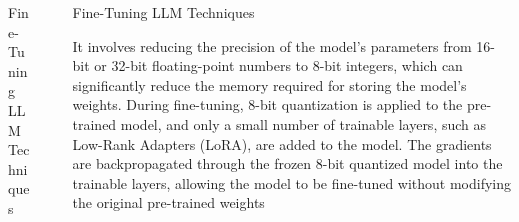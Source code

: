 \documentclass[final]{beamer}
\newlength{\sepwidth}
\newlength{\colwidth}
\newcommand{\separatorcolumn}{\begin{column}{\sepwidth}\end{column}}
\begin{document}
\begin{frame}[t]
\begin{columns}[t]
\begin{column}{\colwidth}
\begin{block}{Fine-Tuning LLM Techniques}
    \end{block}
\end{column}

\separatorcolumn

\begin{column}{\colwidth}
    \begin{block}{Fine-Tuning LLM Techniques}
        \begin{minipage}[t]{.65\textwidth}
            \raggedright
                It involves reducing the precision of the model's parameters from 16-bit or 32-bit floating-point numbers to 8-bit integers, which can significantly reduce the memory required for storing the model's weights. 
                During fine-tuning, 8-bit quantization is applied to the pre-trained model, and only a small number of trainable layers, such as Low-Rank Adapters (LoRA), are added to the model. The gradients are backpropagated through the frozen 8-bit quantized model into the trainable layers, allowing the model to be fine-tuned without modifying the original pre-trained weights
        \end{minipage}
        \begin{minipage}[t]{.30\textwidth}
        \vspace{-1em}
            \begin{figure}[t]
            \centering

\end{figure}
\end{minipage}
\end{block}
\end{column}
\end{columns}
\end{frame}
\end{document}
